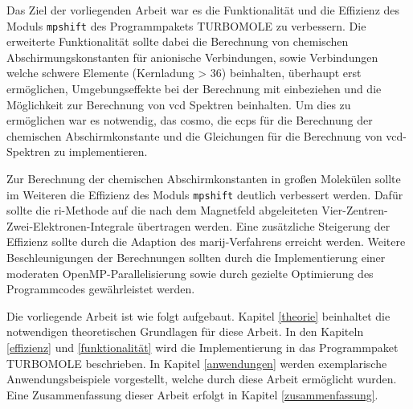 Das Ziel der vorliegenden Arbeit war es die Funktionalität und die Effizienz des Moduls \texttt{mpshift} des Programmpakets \textsc{TURBOMOLE}\supercite{TURBOMOLE,grimme2010consistent,born1927quantentheorie} zu verbessern. Die erweiterte Funktionalität sollte dabei die Berechnung von chemischen Abschirmungskonstanten für anionische Verbindungen, sowie Verbindungen welche schwere Elemente (Kernladung > 36) beinhalten, überhaupt erst ermöglichen, Umgebungseffekte bei der Berechnung mit einbeziehen und die Möglichkeit zur Berechnung von \ac{vcd} Spektren beinhalten. Um dies zu ermöglichen war es notwendig, das \ac{cosmo},\supercite{klamt1993cosmo} die \acp{ecp} für die Berechnung der chemischen Abschirmkonstante und die Gleichungen für die Berechnung von \ac{vcd}-Spektren zu implementieren. 

Zur Berechnung der chemischen Abschirmkonstanten in großen Molekülen sollte im Weiteren die Effizienz des Moduls \texttt{mpshift} deutlich verbessert werden. Dafür sollte die \ac{ri}-Methode auf die nach dem Magnetfeld abgeleiteten Vier-Zentren-Zwei-Elektronen-Integrale übertragen werden. Eine zusätzliche Steigerung der Effizienz sollte durch die Adaption des \ac{marij}-Verfahrens erreicht werden. Weitere Beschleunigungen der Berechnungen sollten durch die Implementierung einer moderaten OpenMP-Parallelisierung sowie durch gezielte Optimierung des Programmcodes gewährleistet werden. 

\bigskip
Die vorliegende Arbeit ist wie folgt aufgebaut. Kapitel \ref{theorie} beinhaltet die notwendigen theoretischen Grundlagen für diese Arbeit. In den Kapiteln \ref{effizienz} und \ref{funktionalität} wird die Implementierung in das Programmpaket \textsc{TURBOMOLE} beschrieben. In Kapitel \ref{anwendungen} werden exemplarische Anwendungsbeispiele vorgestellt, welche durch diese Arbeit ermöglicht wurden. Eine Zusammenfassung dieser Arbeit erfolgt in Kapitel \ref{zusammenfassung}.
